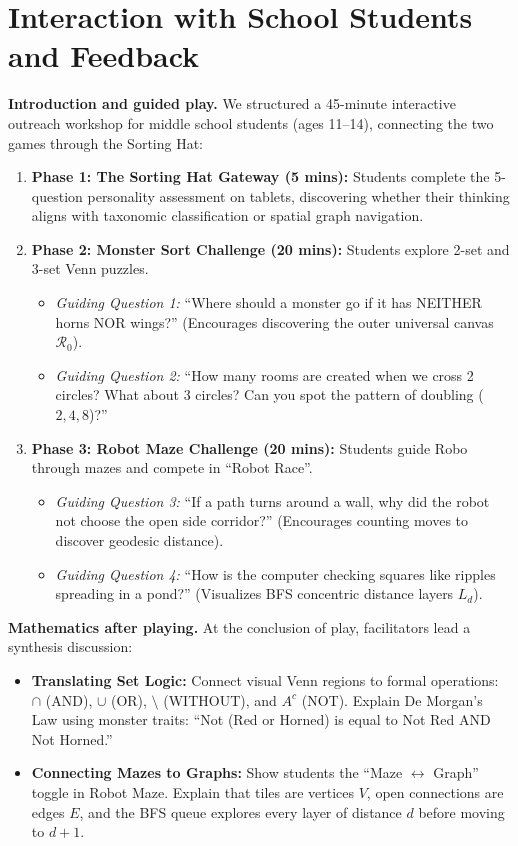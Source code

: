 \documentclass[11pt,a4paper]{article}
\begin{document}
\newpage
\section{Interaction with School Students and Feedback}

\textbf{Introduction and guided play.}
We structured a 45-minute interactive outreach workshop for middle school students (ages 11--14), connecting the two games through the Sorting Hat:
\begin{enumerate}
  \item \textbf{Phase 1: The Sorting Hat Gateway (5 mins):} Students complete the 5-question personality assessment on tablets, discovering whether their thinking aligns with taxonomic classification or spatial graph navigation.
  \item \textbf{Phase 2: Monster Sort Challenge (20 mins):} Students explore 2-set and 3-set Venn puzzles.
  \begin{itemize}
    \item \textit{Guiding Question 1:} ``Where should a monster go if it has NEITHER horns NOR wings?'' (Encourages discovering the outer universal canvas $\mathcal{R}_0$).
    \item \textit{Guiding Question 2:} ``How many rooms are created when we cross 2 circles? What about 3 circles? Can you spot the pattern of doubling ($2, 4, 8$)?''
  \end{itemize}
  \item \textbf{Phase 3: Robot Maze Challenge (20 mins):} Students guide Robo through mazes and compete in ``Robot Race''.
  \begin{itemize}
    \item \textit{Guiding Question 3:} ``If a path turns around a wall, why did the robot not choose the open side corridor?'' (Encourages counting moves to discover geodesic distance).
    \item \textit{Guiding Question 4:} ``How is the computer checking squares like ripples spreading in a pond?'' (Visualizes BFS concentric distance layers $L_d$).
  \end{itemize}
\end{enumerate}

\textbf{Mathematics after playing.}
At the conclusion of play, facilitators lead a synthesis discussion:
\begin{itemize}
  \item \textbf{Translating Set Logic:} Connect visual Venn regions to formal operations: $\cap$ (AND), $\cup$ (OR), $\setminus$ (WITHOUT), and $A^c$ (NOT). Explain De Morgan's Law using monster traits: ``Not (Red or Horned) is equal to Not Red AND Not Horned.''
  \item \textbf{Connecting Mazes to Graphs:} Show students the ``Maze $\leftrightarrow$ Graph'' toggle in Robot Maze. Explain that tiles are vertices $V$, open connections are edges $E$, and the BFS queue explores every layer of distance $d$ before moving to $d+1$.
\end{itemize}
\end{document}
